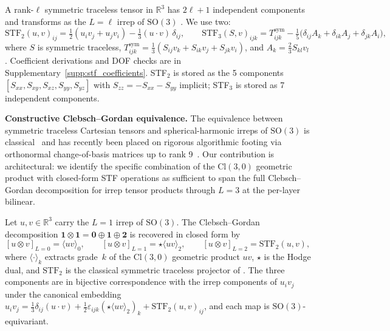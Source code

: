 A rank-$\ell$ symmetric traceless tensor in $\mathbb{R}^3$ has $2\ell+1$ independent components and transforms as the $L{=}\ell$ irrep of $\mathrm{SO}(3)$ \citep{coope1965irreducible,applequist1989traceless,stone2013theory,shao2025orthonormal}. We use two:
\[
\mathrm{STF}_2(u,v)_{ij} = \tfrac{1}{2}(u_iv_j + u_jv_i) - \tfrac{1}{3}(u \cdot v)\,\delta_{ij}, \qquad
\mathrm{STF}_3(S,v)_{ijk} = T^{\text{sym}}_{ijk} - \tfrac{1}{5}\bigl(\delta_{ij}A_k + \delta_{ik}A_j + \delta_{jk}A_i\bigr),
\]
where $S$ is symmetric traceless, $T^{\text{sym}}_{ijk} = \tfrac{1}{3}(S_{ij}v_k + S_{ik}v_j + S_{jk}v_i)$, and $A_k = \tfrac{2}{3}S_{kl}v_l$. Coefficient derivations and DOF checks are in Supplementary~\ref{supp:stf_coefficients}. STF$_2$ is stored as the 5 components $[S_{xx}, S_{xy}, S_{xz}, S_{yy}, S_{yz}]$ with $S_{zz}=-S_{xx}-S_{yy}$ implicit; STF$_3$ is stored as 7 independent components.

\textbf{Constructive Clebsch--Gordan equivalence.} The equivalence between symmetric traceless Cartesian tensors and spherical-harmonic irreps of $\mathrm{SO}(3)$ is classical~\citep{coope1965irreducible,applequist1989traceless,thorne1980multipole,stone2013theory} and has recently been placed on rigorous algorithmic footing via orthonormal change-of-basis matrices up to rank 9~\citep{shao2025orthonormal}. Our contribution is architectural: we identify the specific combination of the $\mathrm{Cl}(3,0)$ geometric product with closed-form STF operations as sufficient to span the full Clebsch--Gordan decomposition for irrep tensor products through $L{=}3$ at the per-layer bilinear.

\begin{theorem}\label{thm:cg_completeness}
Let $u, v \in \mathbb{R}^3$ carry the $L{=}1$ irrep of $\mathrm{SO}(3)$. The Clebsch--Gordan decomposition $\mathbf{1} \otimes \mathbf{1} = \mathbf{0} \oplus \mathbf{1} \oplus \mathbf{2}$ is recovered in closed form by
\[
[u \otimes v]_{L=0} = \langle uv \rangle_0, \qquad
[u \otimes v]_{L=1} = \star\langle uv \rangle_2, \qquad
[u \otimes v]_{L=2} = \mathrm{STF}_2(u,v),
\]
where $\langle \cdot \rangle_k$ extracts grade~$k$ of the $\mathrm{Cl}(3,0)$ geometric product $uv$, $\star$ is the Hodge dual, and $\mathrm{STF}_2$ is the classical symmetric traceless projector of \citet{coope1965irreducible,applequist1989traceless}. The three components are in bijective correspondence with the irrep components of $u_iv_j$ under the canonical embedding $u_iv_j = \tfrac{1}{3}\delta_{ij}(u\cdot v) + \tfrac{1}{2}\varepsilon_{ijk}(\star\langle uv \rangle_2)_k + \mathrm{STF}_2(u,v)_{ij}$, and each map is $\mathrm{SO}(3)$-equivariant.
\end{theorem}

